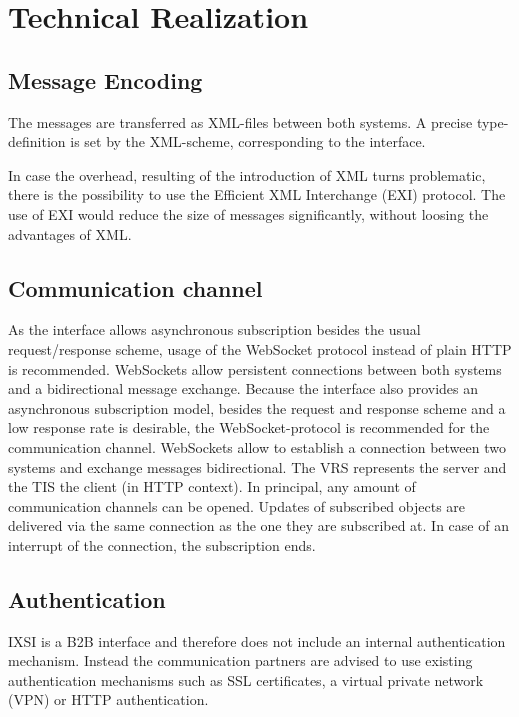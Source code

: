 \chapter{Technical Realization}
\label{sec:TechnischeRealisierung}


\section{Message Encoding}
The messages are transferred as XML-files between both systems. A precise type-definition is set by the XML-scheme, corresponding to the interface.

In case the overhead, resulting of the introduction of XML turns problematic, there is the possibility to use the Efficient XML Interchange (EXI) protocol. The use of EXI would reduce the size of messages significantly, without loosing the advantages of XML. 

\section{Communication channel}
As the interface allows asynchronous subscription besides the usual request/response scheme, usage of the WebSocket protocol instead of plain HTTP is recommended.
WebSockets allow persistent connections between both systems and a bidirectional message exchange. Because the interface also provides an asynchronous subscription model, besides the request and response scheme and a low response rate is desirable, the WebSocket-protocol is recommended for the communication channel. WebSockets allow to establish a connection between two systems and exchange messages bidirectional. The VRS represents the server and the TIS the client (in HTTP context). In principal, any amount of communication channels can be opened. Updates of subscribed objects are delivered via the same connection as the one they are subscribed at. In case of an interrupt of the connection, the subscription ends.

\section{Authentication}
IXSI is a B2B interface and therefore does not include an internal authentication mechanism. Instead the communication partners are advised to use existing authentication mechanisms such as SSL certificates, a virtual private network (VPN) or HTTP authentication.

